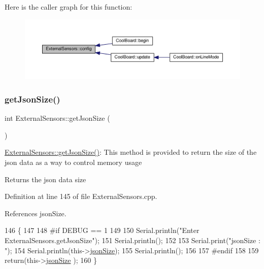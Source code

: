Here is the caller graph for this function\+:\nopagebreak
\begin{figure}[H]
\begin{center}
\leavevmode
\includegraphics[width=350pt]{classExternalSensors_a862a4bd11346b37270d0244c2adabe5a_icgraph}
\end{center}
\end{figure}
\mbox{\label{classExternalSensors_a8e3a93efa8f5a0477f300e26084b6625}} 
\subsubsection{\texorpdfstring{get\+Json\+Size()}{getJsonSize()}}
{\footnotesize\ttfamily int External\+Sensors\+::get\+Json\+Size (\begin{DoxyParamCaption}{ }\end{DoxyParamCaption})}

\hyperlink{classExternalSensors_a8e3a93efa8f5a0477f300e26084b6625}{External\+Sensors\+::get\+Json\+Size()}\+: This method is provided to return the size of the json data as a way to control memory usage

\begin{DoxyReturn}{Returns}
the json data size 
\end{DoxyReturn}


Definition at line 145 of file External\+Sensors.\+cpp.



References json\+Size.


\begin{DoxyCode}
146 \{
147     
148 \textcolor{preprocessor}{#if DEBUG == 1}
149 
150     Serial.println(\textcolor{stringliteral}{"Enter ExternalSensors.getJsonSize"});
151     Serial.println();
152     
153     Serial.print(\textcolor{stringliteral}{"jsonSize : "});
154     Serial.println(this->\hyperlink{classExternalSensors_acacea86d74d967b57fcff282d26cff57}{jsonSize});
155     Serial.println();
156 
157 \textcolor{preprocessor}{#endif }
158 
159     \textcolor{keywordflow}{return}(this->\hyperlink{classExternalSensors_acacea86d74d967b57fcff282d26cff57}{jsonSize} );
160 \}
\end{DoxyCode}
\mbox{\label{classExternalSensors_a78c2bf55084435dd51d3c559b2d3c6f3}} 
